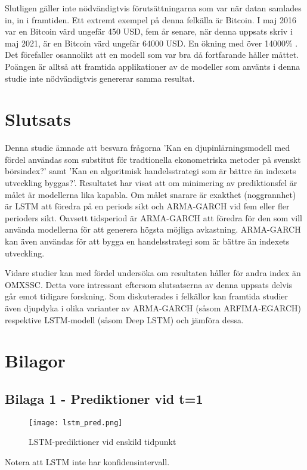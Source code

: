\documentclass[11pt]{article}
\begin{document}
Slutligen gäller inte nödvändigtvis förutsättningarna som var när datan samlades in, in i framtiden. Ett extremt exempel på denna felkälla är Bitcoin. I maj 2016 var en Bitcoin värd ungefär 450 USD, fem år senare, när denna uppsats skriv i maj 2021, är en Bitcoin värd ungefär 64000 USD. En ökning med över 14000\% \parencite{yahoo_bitcoin}. Det förefaller osannolikt att en modell som var bra då fortfarande håller måttet. Poängen är alltså att framtida applikationer av de modeller som använts i denna studie inte nödvändigtvis genererar samma resultat.


\section{Slutsats}
Denna studie ämnade att besvara frågorna 'Kan en djupinlärningsmodell med fördel användas som substitut för tradtionella ekonometriska metoder på svenskt börsindex?' samt 'Kan en algoritmisk handelsstrategi som är bättre än indexets utveckling byggas?'. Resultatet har visat att om minimering av prediktionsfel är målet är modellerna lika kapabla. Om målet snarare är exakthet (noggrannhet) är LSTM att föredra på en periods sikt och ARMA-GARCH vid fem eller fler perioders sikt. Oavsett tidsperiod är ARMA-GARCH att föredra för den som vill använda modellerna för att generera högsta möjliga avkastning. ARMA-GARCH kan även användas för att bygga en handelsstrategi som är bättre än indexets utveckling.

Vidare studier kan med fördel undersöka om resultaten håller för andra index än OMXSSC. Detta vore intressant eftersom slutsatserna av denna uppsats delvis går emot tidigare forskning. Som diskuterades i felkällor kan framtida studier även djupdyka i olika varianter av ARMA-GARCH (såsom ARFIMA-EGARCH) respektive LSTM-modell (såsom Deep LSTM) och jämföra dessa.



\newpage
\section{Bilagor}

\subsection{Bilaga 1 - Prediktioner vid t=1}
\begin{figure}[H]
\caption{LSTM-prediktioner vid enskild tidpunkt}
\texttt{[image: lstm\_pred.png]}
\centering
\end{figure}
Notera att LSTM inte har konfidensintervall.
\end{document}

